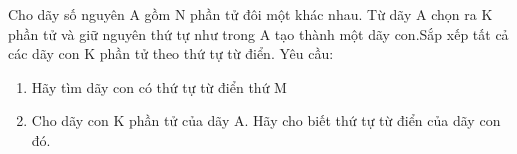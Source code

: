 Cho dãy số nguyên A gồm N phần tử đôi một khác nhau. Từ dãy A chọn ra K phần tử và giữ nguyên thứ tự như trong A tạo thành một dãy con.Sắp xếp tất cả các dãy con K phần tử theo thứ tự từ điển. Yêu cầu:  
\begin{enumerate}
	\item     Hãy tìm dãy con có thứ tự từ điển thứ M   
	\item     Cho dãy con K phần tử của dãy A. Hãy cho biết thứ tự từ điển của dãy con đó.   
\end{enumerate}